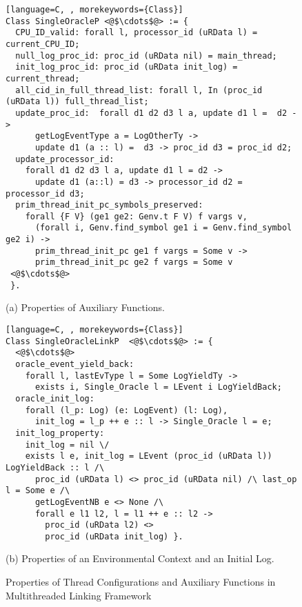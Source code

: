 \begin{figure}
\begin{lstlisting}[language=C, , morekeywords={Class}]
Class SingleOracleP <@$\cdots$@> := {
  CPU_ID_valid: forall l, processor_id (uRData l) = current_CPU_ID;
  null_log_proc_id: proc_id (uRData nil) = main_thread;
  init_log_proc_id: proc_id (uRData init_log) = current_thread;
  all_cid_in_full_thread_list: forall l, In (proc_id (uRData l)) full_thread_list;
  update_proc_id:  forall d1 d2 d3 l a, update d1 l =  d2 ->
      getLogEventType a = LogOtherTy ->
      update d1 (a :: l) =  d3 -> proc_id d3 = proc_id d2;
  update_processor_id:
    forall d1 d2 d3 l a, update d1 l = d2 -> 
      update d1 (a::l) = d3 -> processor_id d2 = processor_id d3;   
  prim_thread_init_pc_symbols_preserved:
    forall {F V} (ge1 ge2: Genv.t F V) f vargs v,
      (forall i, Genv.find_symbol ge1 i = Genv.find_symbol ge2 i) ->
      prim_thread_init_pc ge1 f vargs = Some v ->
      prim_thread_init_pc ge2 f vargs = Some v
 <@$\cdots$@>      
 }.
\end{lstlisting}
\begin{center}
(a) Properties of Auxiliary Functions.
\end{center}

\begin{lstlisting}[language=C, , morekeywords={Class}]
Class SingleOracleLinkP  <@$\cdots$@> := {
  <@$\cdots$@>
  oracle_event_yield_back:
    forall l, lastEvType l = Some LogYieldTy ->
      exists i, Single_Oracle l = LEvent i LogYieldBack;
  oracle_init_log:
    forall (l_p: Log) (e: LogEvent) (l: Log),
      init_log = l_p ++ e :: l -> Single_Oracle l = e;
  init_log_property:
    init_log = nil \/
    exists l e, init_log = LEvent (proc_id (uRData l)) LogYieldBack :: l /\
      proc_id (uRData l) <> proc_id (uRData nil) /\ last_op l = Some e /\
      getLogEventNB e <> None /\
      forall e l1 l2, l = l1 ++ e :: l2 ->
        proc_id (uRData l2) <> 
        proc_id (uRData init_log) }.
\end{lstlisting}
\begin{center}
(b) Properties of an Environmental Context and an Initial Log.
\end{center}
\caption{Properties of Thread Configurations and Auxiliary Functions in Multithreaded Linking Framework}	
\label{fig:chapter:conlink:multithreaded-configuration-props}
\end{figure}

